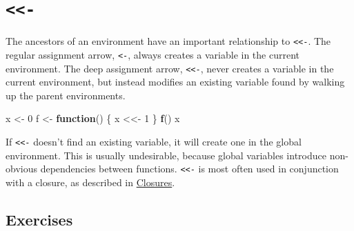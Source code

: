 \documentclass[]{book}
\newenvironment{Shaded}{\begin{snugshade}}{\end{snugshade}}
\newcommand{\ControlFlowTok}[1]{\textcolor[rgb]{0.13,0.29,0.53}{\textbf{#1}}}
\newcommand{\DecValTok}[1]{\textcolor[rgb]{0.00,0.00,0.81}{#1}}
\newcommand{\KeywordTok}[1]{\textcolor[rgb]{0.13,0.29,0.53}{\textbf{#1}}}
\newcommand{\NormalTok}[1]{#1}
\newcommand{\StringTok}[1]{\textcolor[rgb]{0.31,0.60,0.02}{#1}}
\theoremstyle{definition}
\theoremstyle{definition}
\theoremstyle{definition}
\theoremstyle{remark}
\begin{document}
\hypertarget{section}{%
\section{\texorpdfstring{\texttt{\textless{}\textless{}-}}{\textless{}\textless{}-}}\label{section}}

The ancestors of an environment have an important relationship to
\texttt{\textless{}\textless{}-}. The regular assignment arrow,
\texttt{\textless{}-}, always creates a variable in the current
environment. The deep assignment arrow,
\texttt{\textless{}\textless{}-}, never creates a variable in the
current environment, but instead modifies an existing variable found by
walking up the parent environments.

\begin{Shaded}
\begin{Highlighting}[]
\NormalTok{x <-}\StringTok{ }\DecValTok{0}
\NormalTok{f <-}\StringTok{ }\ControlFlowTok{function}\NormalTok{() \{}
\NormalTok{  x <<-}\StringTok{ }\DecValTok{1}
\NormalTok{\}}
\KeywordTok{f}\NormalTok{()}
\NormalTok{x}
\end{Highlighting}
\end{Shaded}

If \texttt{\textless{}\textless{}-} doesn't find an existing variable,
it will create one in the global environment. This is usually
undesirable, because global variables introduce non-obvious dependencies
between functions. \texttt{\textless{}\textless{}-} is most often used
in conjunction with a closure, as described in
\protect\hyperlink{closures}{Closures}.

\hypertarget{exercises-10}{%
\subsection{Exercises}\label{exercises-10}}
\end{document}
